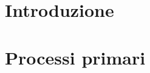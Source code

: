\documentclass{article}
\begin{document}


\section{Introduzione}
\label{sec:introduzione}



\newpage

\section{Processi primari}
\label{sec:processi-primari}


\newpage
\end{document}
